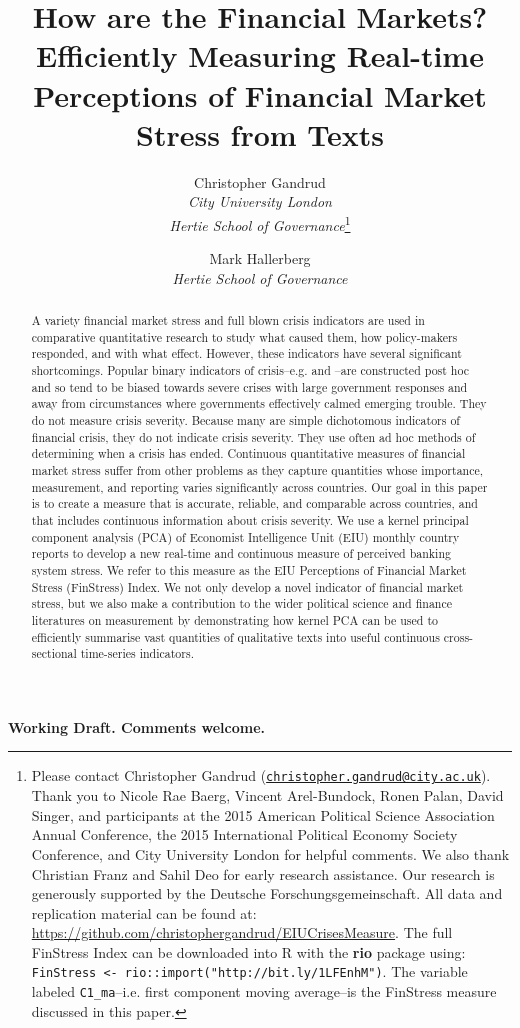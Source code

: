 \documentclass[]{article}
\title{How are the Financial Markets? Efficiently Measuring Real-time Perceptions of Financial Market Stress from Texts}
\author{Christopher Gandrud \\ \emph{City University London} \\ \emph{Hertie School of Governance}\footnote{Please contact Christopher Gandrud
(\href{mailto:christopher.gandrud@city.ac.uk}{\nolinkurl{christopher.gandrud@city.ac.uk}}).
Thank you to Nicole Rae Baerg, Vincent Arel-Bundock, Ronen Palan, David Singer, and participants at the 2015 American Political Science Association Annual Conference, the 2015 International Political Economy Society Conference, and City University London for helpful comments. We also thank Christian Franz and Sahil Deo for early research assistance. Our research is generously supported by the Deutsche Forschungsgemeinschaft. All data and replication material can be found at:
\url{https://github.com/christophergandrud/EIUCrisesMeasure}. The full FinStress Index can be downloaded into R with the \textbf{rio} package using: \texttt{FinStress <- rio::import("http://bit.ly/1LFEnhM")}. The variable labeled \texttt{C1\_ma}--i.e. first component moving average--is the FinStress measure discussed in this paper.}
\and
Mark Hallerberg \\ \emph{Hertie School of Governance}}
\begin{document}
\maketitle

\begin{center}
    \textbf{Working Draft. Comments welcome.}
\end{center}

\begin{abstract}
    A variety financial market stress and full blown crisis indicators are used in comparative quantitative research to study what caused them, how policy-makers responded, and with what effect. However, these indicators have several significant shortcomings. Popular binary indicators of crisis--e.g. \cite{Reinhart2009,ReinhartRog2010} and \cite{laeven2013}--are constructed post hoc and so tend to be biased towards severe crises with large government responses and away from circumstances where governments effectively calmed emerging trouble. They do not measure crisis severity. Because many are simple dichotomous indicators of financial crisis, they do not indicate crisis severity. They use often ad hoc methods of determining when a crisis has ended. Continuous quantitative measures of financial market stress suffer from other problems as they capture quantities whose importance, measurement, and reporting varies significantly across countries. Our goal in this paper is to create a measure that is accurate, reliable, and comparable across countries, and that includes continuous information about crisis severity. We use a kernel principal component analysis (PCA) of Economist Intelligence Unit (EIU) monthly country reports to develop a new real-time and continuous measure of perceived banking system stress. We refer to this measure as the EIU Perceptions of Financial Market Stress (FinStress) Index. We not only develop a novel indicator of financial market stress, but we also make a contribution to the wider political science and finance literatures on measurement by demonstrating how kernel PCA can be used to efficiently summarise vast quantities of qualitative texts into useful continuous cross-sectional time-series indicators.

\end{abstract}
\end{document}
